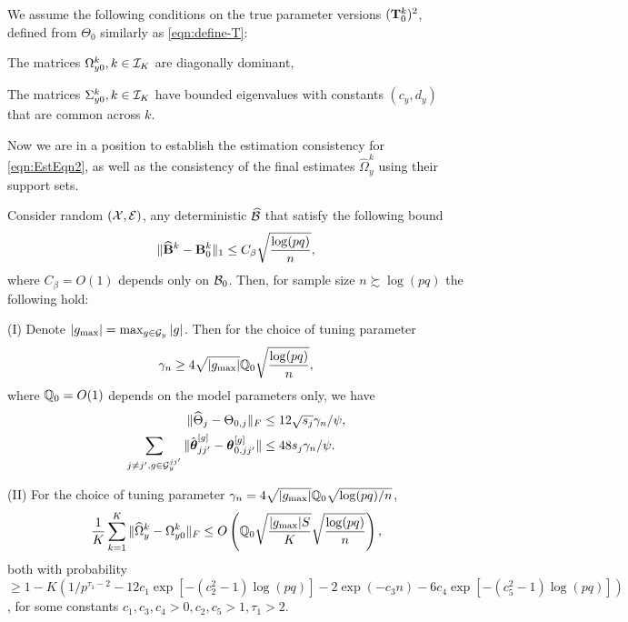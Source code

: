 We assume the following conditions on the true parameter versions $({\mathbf{T}}_0^k)^2$, defined from $\Theta_0$ similarly as \eqref{eqn:define-T}:
%

\vspace{1em}
 The matrices $\Omega_{y0}^k, k \in {\cal{I}}_K$ are diagonally dominant,

 The matrices $\Sigma_{y0}^k, k \in {\cal{I}}_K$ have bounded eigenvalues with constants $(c_y, d_y)$ that are common across $k$.
\vspace{1em}
%

\noindent Now we are in a position to establish the estimation consistency for \eqref{eqn:EstEqn2}, as well as the consistency of the final estimates $\widehat \Omega_y^k$ using their support sets.

\begin{theorem}\label{thm:thm-Theta}
Consider random $({\cal{X}}, {\cal{E}})$, any deterministic $\widehat {{\cal{B}}}$ that satisfy the following bound
%
$$
\| \widehat {{\mathbf{B}}}^k - {\mathbf{B}}_0^k \|_1 \leq C_\beta \sqrt{ \frac{ \log(pq)}{n}},
$$
%
where $C_\beta = O(1)$ depends only on ${\cal{B}}_0$. Then, for sample size $n \succsim \log (pq)$ the following hold:

\noindent (I) Denote $|g_{\max}| = \max_{g \in {\cal{G}}_y} |g|$. Then for the choice of tuning parameter
%
$$
\gamma_n \geq 4 \sqrt{| g_{\max}|} {\mathbb{Q}}_0 \sqrt {\frac{ \log (p q)}{n}},
$$
%
where ${\mathbb{Q}}_0 = O(1)$ depends on the model parameters only, we have
%
\begin{align}
\| \widehat \Theta_j - \Theta_{0,j} \|_F & \leq 12 \sqrt{s_j} \gamma_n / \psi, \label{eqn:theta-norm-bound-1}\\
\sum_{j \neq j', g \in {\cal{G}}_y^{jj'}} \| \hat {{\boldsymbol{\theta}}}_{jj'}^{[g]} - {\boldsymbol{\theta}}_{0,jj'}^{[g]} \| & \leq 48 s_j \gamma_n / \psi. \label{eqn:theta-norm-bound-2}
\end{align}
%

\noindent (II) For the choice of tuning parameter $\gamma_n = 4 \sqrt{| g_{\max}|} {\mathbb{Q}}_0 \sqrt{\log (p q)/n}$,
%
\begin{align}\label{eqn:OmegaBounds0}
\frac{1}{K} \sum_{k=1}^K \| \widehat \Omega_y^k - \Omega_{y0}^k \|_F \leq
O \left( {\mathbb{Q}}_0 \sqrt{\frac{| g_{\max}| S}{K}} 
\sqrt {\frac{ \log (p q)}{n}} \right),
\end{align}
%
both with probability $\geq 1 - K( 1/p^{\tau_1-2} - 12 c_1 \exp [-(c_2^2-1) \log(pq)] - 2 \exp (- c_3 n) - 6c_4 \exp [-(c_5^2-1) \log(pq)])$, for some constants $c_1, c_3, c_4 > 0, c_2, c_5 > 1, \tau_1 > 2$.
\end{theorem}

